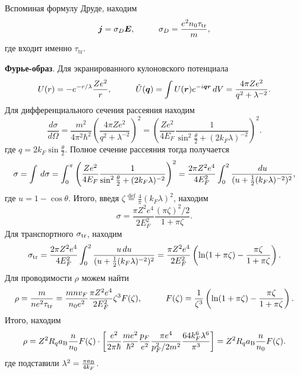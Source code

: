 Вспоминая формулу Друде, находим
\begin{equation*}
	\vc{j} = \sigma_D \vc{E},
	\hspace{10 mm} 
	\sigma_D = \frac{e^2 n_0 \sub{\tau}{tr}}{m},
\end{equation*}
где входит именно $\tau_{\text{tr}}$.





\textbf{Фурье-образ}. Для экранированного кулоновского потенциала 
\begin{equation*}
	U(r) = - e^{-r/\lambda} \frac{Z e^2}{r},
	\hspace{10 mm} 
	\tilde{U}(\vc{q}) = \int U(\vc{r}) e^{-i \vc{q} \vc{r}} \d V = \frac{4 \pi Z e^2}{q^2 + \lambda^{-2}}.
\end{equation*}
Для дифференциального сечения рассеяния находим
\begin{equation*}
	\frac{d \sigma}{d \Omega} = \frac{m^2}{4 \pi^2 \hbar^2} \left(
		\frac{4\pi Z e^2}{q^2+\lambda^{-2}}
	\right)^2 = \left(
		\frac{Z e^2}{4 E_F} \frac{1}{\sin^2 \frac{\theta}{2} + (2 k_F \lambda)^{-2}}
	\right)^2.
\end{equation*}
где $q = 2 k_F \sin \frac{\theta}{2}$.
Полное сечение рассеяния тогда получается
\begin{equation*}
	\sigma = \int \, d \sigma = \int_{0}^{\pi} \left(
		\frac{Z e^2}{4 E_F} \frac{1}{\sin^2 \frac{\theta}{2} + (2 k_F \lambda)^{-2}}
	\right)^2 = \frac{2\pi Z^2 e^4}{4 E_F^2} \int_{0}^{2}  \frac{\, d u}{(u + \frac{1}{2}(k_F \lambda)^{-2})^2},
\end{equation*}
где $u = 1 - \cos \theta$.  Итого, введя $\zeta \overset{\mathrm{def}}{=}  \frac{4}{\pi} (k_F \lambda)^2$, находим
\begin{equation*}
	\sigma = \frac{\pi Z^2 e^4}{2 E_F^2} \frac{(\pi \zeta)^2/2}{1 + \pi \zeta}.
\end{equation*}
Для транспортного $\sigma_{\textnormal{tr}}$, находим
\begin{equation*}
	\sigma_{\textnormal{tr}} = \frac{2\pi Z^2 e^4}{4 E_F^2} \int_{0}^{2}  \frac{u \, d u}{(u + \frac{1}{2}(k_F \lambda)^{-2})^2} = \frac{\pi Z^2 e^4}{2 E_F^2} \left(
		\ln(1+\pi \zeta) - \frac{\pi \zeta}{1+\pi \zeta}
	\right).
\end{equation*}
Для проводимости $\rho$ можем найти
\begin{equation*}
	\rho = \frac{m}{n e^2 \sub{\tau}{tr}} = \frac{m n v_F}{n_0 e^2} \frac{\pi Z^2 e^4}{2 E_F^2} \zeta^3 F(\zeta),
	\hspace{10 mm} 
	F(\zeta) = \frac{1}{\zeta^3} \left(
		\ln(1+\pi \zeta) - \frac{\pi \zeta}{1+\pi \zeta}
	\right).
\end{equation*}
Итого, находим
\begin{equation}
	\rho = Z^2 R_q a_{\textnormal{B}} \frac{n}{n_0} F(\zeta) \cdot \left[
		\frac{e^2}{2 \pi \hbar} \frac{m e^2}{\hbar^2} \frac{p_F}{e^2} \frac{\pi e^4}{p_F^2/2m^2} \frac{64 k_F^6 \lambda^6}{\pi^3}
	\right] = Z^2 R_q a_{\textnormal{B}} \frac{n}{n_0} F(\zeta).
\end{equation}
где подставили $\lambda^2 = \frac{\pi a_{\textnormal{B}}}{4 k_F}$.





